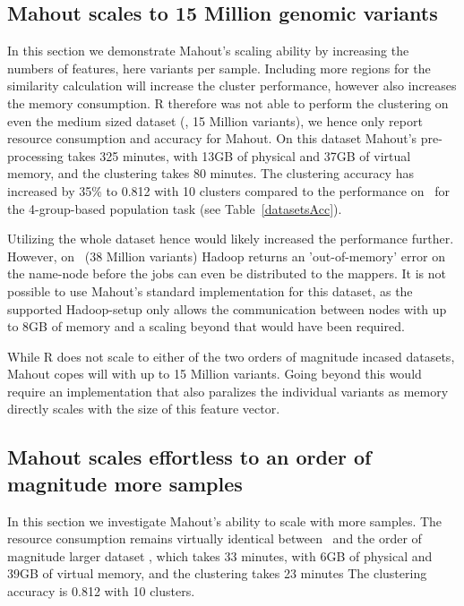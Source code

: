 \documentclass{bioinfo}
\begin{document}
\subsection*{Mahout scales to 15 Million genomic variants}
In this section we demonstrate Mahout's scaling ability by increasing the numbers of features, here variants per sample. 
Including more regions for the similarity calculation will increase the cluster performance, however also increases the memory consumption. 
R therefore was not able to perform the clustering on even the medium sized dataset (\SevenPhaseone , 15 Million variants), we hence only report resource consumption and accuracy for Mahout.
On this dataset Mahout's pre-processing takes 325 minutes, with 13GB of physical and 37GB of virtual memory, and the clustering takes 80 minutes.
The clustering accuracy has increased by 35\% to 0.812 with 10 clusters compared to the performance on \NinteenPhaseone\ for the 4-group-based population task (see Table~\ref{datasetsAcc}).

Utilizing the whole dataset hence would likely increased the performance further. However, on \FullPhasethree\ (38 Million variants) Hadoop returns an 'out-of-memory' error on the name-node before the jobs can even be distributed to the mappers. 
It is not possible to use Mahout's standard implementation for this dataset, as the supported Hadoop-setup only allows the communication between nodes with up to 8GB of memory and a scaling beyond that would have been required.

While R does not scale to either of the two orders of magnitude incased datasets, Mahout copes will with up to 15 Million variants. Going beyond this would require an implementation that also paralizes the individual variants as memory directly scales with the size of this feature vector.  


\subsection*{Mahout scales effortless to an order of magnitude more samples}
In this section we investigate Mahout's ability to scale with more samples.
The resource consumption remains virtually identical between \SevenPhaseone\ and the order of magnitude larger dataset \OnePhasethree, which takes 33 minutes, with 6GB of physical and 39GB of virtual memory, and the clustering takes 23 minutes 
The clustering accuracy is 0.812 with 10 clusters.
\end{document}
